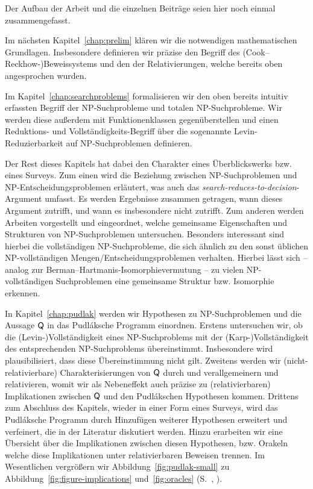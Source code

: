 Der Aufbau der Arbeit und die einzelnen Beiträge seien hier noch einmal zusammengefasst.

Im nächsten Kapitel~\ref{chap:prelim} klären wir die notwendigen mathematischen Grundlagen. Insbesondere definieren wir präzise den Begriff des (Cook–Reckhow-)Beweissystems und den der Relativierungen, welche bereits oben angesprochen wurden.

Im Kapitel~\ref{chap:searchproblems} formalisieren wir den oben bereits intuitiv erfassten Begriff der NP-Suchprobleme und totalen NP-Suchprobleme. 
Wir werden diese außerdem mit Funktionenklassen gegenüberstellen und einen Reduktions- und Vollständigkeits-Begriff über die sogenannte Levin-Reduzierbarkeit auf NP-Suchproblemen definieren.

Der Rest dieses Kapitels hat dabei den Charakter eines Überblickswerks bzw. eines Surveys. 
Zum einen wird die Beziehung zwischen NP-Suchproblemen und NP-Entscheidungsproblemen erläutert, was auch das \emph{search-reduces-to-decision}-Argument umfasst. Es werden Ergebnisse zusammen getragen, wann dieses Argument zutrifft, und wann es insbesondere nicht zutrifft.
Zum anderen werden Arbeiten vorgestellt und eingeordnet, welche gemeinsame Eigenschaften und Strukturen von NP-Suchproblemen untersuchen. Besonders interessant sind hierbei die vollständigen NP-Suchprobleme, die sich ähnlich zu den sonst üblichen NP-vollständigen Mengen/Entscheidungsproblemen verhalten. Hierbei lässt sich – analog zur Berman–Hartmanis-Isomorphievermutung – zu vielen NP-vollständigen Suchproblemen eine gemeinsame Struktur bzw. Isomorphie erkennen.

In Kapitel~\ref{chap:pudlak} werden wir Hypothesen zu NP-Suchproblemen und die Aussage $\mathsf{Q}$ in das Pudláksche Programm einordnen. Erstens untersuchen wir, ob die (Levin-)Vollständigkeit eines NP-Suchproblems  mit der (Karp-)Vollständigkeit des entsprechenden NP-Suchproblems übereinstimmt. Insbesondere wird plausibilisiert, dass diese Übereinstimmung nicht gilt.
Zweitens werden wir (nicht-relativierbare) Charakterisierungen von $\mathsf{Q}$ durch \textcite{fenner_inverting_2003} und \textcite{messner_simulation_2001} verallgemeinern und relativieren, womit wir als Nebeneffekt auch präzise zu (relativierbaren) Implikationen zwischen $\mathsf{Q}$ und den Pudlákschen Hypothesen kommen.
Drittens zum Abschluss des Kapitels, wieder in einer Form eines Surveys, wird das Pudláksche Programm durch Hinzufügen weiterer Hypothesen erweitert und verfeinert, die in der Literatur diskutiert werden. Hinzu erarbeiten wir eine Übersicht über die Implikationen zwischen diesen Hypothesen, bzw. Orakeln welche diese Implikationen unter relativierbaren Beweisen trennen. Im Wesentlichen vergrößern wir Abbildung~\ref{fig:pudlak-small} zu Abbildung~\ref{fig:figure-implications} und~\ref{fig:oracles} (S.~\pageref{fig:figure-implications}, \pageref{fig:oracles}).

